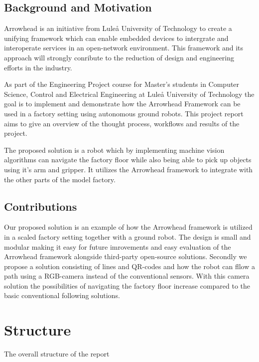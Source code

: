 \subsection{Background and Motivation}
Arrowhead is an initiative from Luleå University of Technology to create a unifying framework which can enable embedded devices to intergrate and interoperate services in an open-network environment. This framework and its approach will strongly conribute to the reduction of design and engineering efforts in the industry. 

As part of the Engineering Project course for Master's students in Computer Science, Control and Electrical Engineering at Luleå University of Technology the goal is to implement and demonstrate how the Arrowhead Framework can be used in a factory setting using autonomous ground robots. This project report aims to give an overview of the thought process, workflows and results of the project.

The proposed solution is a robot which by implementing machine vision algorithms can navigate the factory floor while also being able to pick up objects using it's arm and gripper. It utilizes the Arrowhead framework to integrate with the other parts of the model factory. 

\subsection{Contributions}
Our proposed solution is an example of how the Arrowhead framework is utilized in a scaled factory setting together with a ground robot. The design is small and modular making it easy for future imrovements and easy evaluation of the Arrowhead framework alongside third-party open-source solutions. Secondly we propose a solution consisting of lines and QR-codes and how the robot can fllow a path using a RGB-camera instead of the conventional sensors. With this camera solution the possibilities of navigating the factory floor increase compared to the basic conventional following solutions. 
\section*{Structure}
The overall structure of the report
